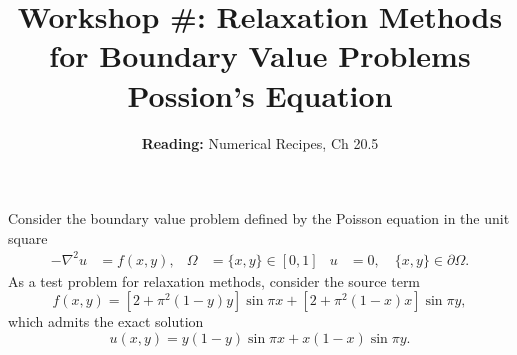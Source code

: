 \documentclass[11pt]{article}
\title{Workshop \#: Relaxation Methods for Boundary Value Problems \\ Possion's Equation }
\author{\textbf{Reading: } Numerical Recipes, Ch 20.5 }
\date{}                                           %
\begin{document}
\maketitle

 Consider the boundary value problem defined by the Poisson equation in the unit square
\begin{align}
-\nabla^2 u &= f(x,y), &  \Omega &= \{x,y\} \in [0,1] & u &= 0, \quad \{x,y\} \in \partial \Omega.
\end{align}
As a test problem for relaxation methods, consider the source term
\begin{equation}
f(x,y) = [2 + \pi^2(1-y)y] \sin{\pi x} + [2 + \pi^2(1-x)x] \sin{\pi y},
\end{equation}
which admits the exact solution
\begin{equation}
u(x,y) = y(1-y) \sin{\pi x} + x(1-x) \sin{\pi y}.
\end{equation}
\dotfill
\end{document}
